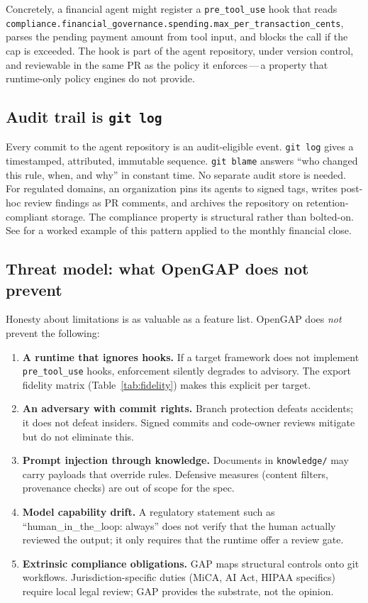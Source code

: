 \documentclass[11pt,a4paper]{article}
\begin{document}
Concretely, a financial agent might register a \texttt{pre\_tool\_use} hook that reads
\texttt{compliance.financial\_governance.spending.max\_per\_transaction\_cents}, parses
the pending payment amount from tool input, and blocks the call if the cap is
exceeded. The hook is part of the agent repository, under version control, and
reviewable in the same PR as the policy it enforces\,---\,a property that runtime-only
policy engines do not provide.

\subsection{Audit trail is \texttt{git log}}

Every commit to the agent repository is an audit-eligible event. \texttt{git log}
gives a timestamped, attributed, immutable sequence. \texttt{git blame} answers
``who changed this rule, when, and why'' in constant time. No separate audit store is
needed. For regulated domains, an organization pins its agents to signed tags, writes
post-hoc review findings as PR comments, and archives the repository on
retention-compliant storage. The compliance property is structural rather than
bolted-on. See \cite{gitclose} for a worked example of this pattern applied to the
monthly financial close.

\subsection{Threat model: what OpenGAP does not prevent}\label{sec:threat}

Honesty about limitations is as valuable as a feature list. OpenGAP does \emph{not}
prevent the following:

\begin{enumerate}
  \item \textbf{A runtime that ignores hooks.} If a target framework does not implement
  \texttt{pre\_tool\_use} hooks, enforcement silently degrades to advisory. The export
  fidelity matrix (Table~\ref{tab:fidelity}) makes this explicit per target.
  \item \textbf{An adversary with commit rights.} Branch protection defeats accidents;
  it does not defeat insiders. Signed commits and code-owner reviews mitigate but do
  not eliminate this.
  \item \textbf{Prompt injection through knowledge.} Documents in \texttt{knowledge/}
  may carry payloads that override rules. Defensive measures (content filters,
  provenance checks) are out of scope for the spec.
  \item \textbf{Model capability drift.} A regulatory statement such as
  ``human\_in\_the\_loop: always'' does not verify that the human actually reviewed the
  output; it only requires that the runtime offer a review gate.
  \item \textbf{Extrinsic compliance obligations.} GAP maps structural controls onto
  git workflows. Jurisdiction-specific duties (MiCA, AI Act, HIPAA specifics) require
  local legal review; GAP provides the substrate, not the opinion.
\end{enumerate}
\end{document}
